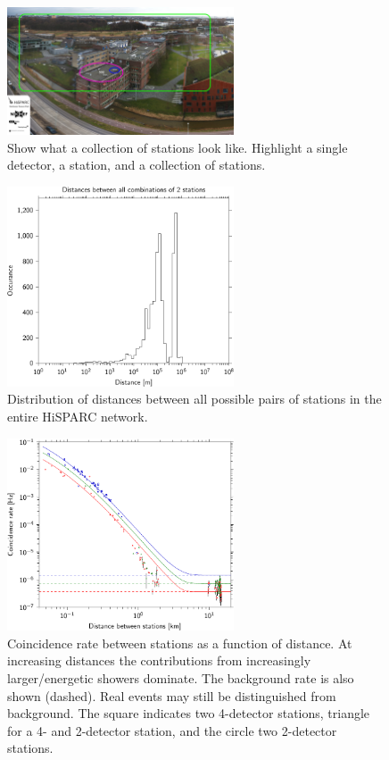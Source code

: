 \begin{figure}
    \centering
    \includegraphics[width=0.6\textwidth]
                    {plots/experiment/ADL_151373_151429_layers.jpg}
    \caption{Show what a collection of stations look like. Highlight a single detector, a station, and a collection of stations.}
    \label{fig:ADL_151373_151429_layers}
\end{figure}


\begin{figure}
    \centering
    \includegraphics[width=0.6\textwidth]
                    {plots/experiment/network_station_distances}
    \caption{Distribution of distances between all possible pairs of stations in the entire HiSPARC network.}
    \label{fig:network_station_distances}
\end{figure}


\begin{figure}
    \centering
    \includegraphics[width=0.6\textwidth]
                    {plots/experiment/distance_v_coincidence_rate}
    \caption{Coincidence rate between stations as a function of distance. At increasing distances the contributions from increasingly larger/energetic showers dominate. The background rate is also shown (dashed). Real events may still be distinguished from background. The square indicates two 4-detector stations, triangle for a 4- and 2-detector station, and the circle two 2-detector stations.}
    \label{fig:distance_v_coincidence_rate}
\end{figure}


